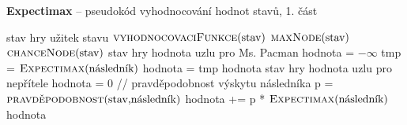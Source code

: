 \begin{algorithm}
\caption{\textbf{Expectimax} -- pseudokód vyhodnocování hodnot stavů, 1. část}
\label{alg:expectimax}
\begin{algorithmic}[1]

\Require stav hry
\Ensure užitek stavu
    \State \Return $\text{\Call{vyhodnocovaciFunkce}{stav}}$  
  \EndIf
    \State \Return $\text{\Call{maxNode}{stav}}$  
  \EndIf
    \State \Return $\text{\Call{chanceNode}{stav}}$  
  \EndIf
\EndFunction
\algrule
\Require stav hry
\Ensure hodnota uzlu pro Ms. Pacman
    \State hodnota = $-\infty$
    \State tmp = $\text{\Call{Expectimax}{následník}}$
     
        \State hodnota = tmp
      \EndIf
    \EndFor 
    \State \Return hodnota
\EndFunction
\algrule
\Require stav hry
\Ensure hodnota uzlu pro nepřítele
    \State hodnota = 0
    \State // pravděpodobnost výskytu následníka  
    \State p = $\text{\Call{pravděpodobnost}{stav,následník}}$
    \State hodnota += p * $\text{\Call{Expectimax}{následník}}$
    \EndFor
    \State \Return hodnota 
\EndFunction

\end{algorithmic}
\end{algorithm}
\newpage

